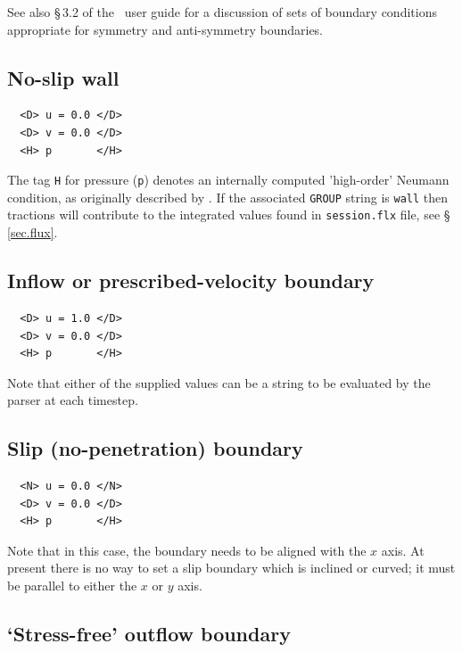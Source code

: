 \documentclass[11pt]{report}
\begin{document}
See also \S\,3.2 of the \Dog\ user guide for a discussion of sets of
boundary conditions appropriate for symmetry and anti-symmetry
boundaries.

\subsection{No-slip wall}

{\small
\begin{verbatim}
  <D> u = 0.0 </D>
  <D> v = 0.0 </D>
  <H> p       </H>
\end{verbatim}
}
\noindent The tag \verb+H+ for pressure (\verb+p+) denotes an
internally computed 'high-order' Neumann condition, as originally
described by \citet{kio91}.  If the associated \verb|GROUP| string is
\verb|wall| then tractions will contribute to the integrated values
found in \verb+session.flx+ file, see \S\,\ref{sec.flux}.

\subsection{Inflow or prescribed-velocity boundary}

{\small
\begin{verbatim}
  <D> u = 1.0 </D>
  <D> v = 0.0 </D>
  <H> p       </H>
\end{verbatim}
}
\noindent Note that either of the supplied values can be a string to
be evaluated by the parser at each timestep.

\subsection{Slip (no-penetration) boundary}

{\small
\begin{verbatim}
  <N> u = 0.0 </N>
  <D> v = 0.0 </D>
  <H> p       </H>
\end{verbatim}
}
\noindent Note that in this case, the boundary needs to be aligned
with the $x$ axis.  At present there is no way to set a slip boundary
which is inclined or curved; it must be parallel to either the $x$ or
$y$ axis.

\subsection{`Stress-free' outflow boundary}
\label{sec.stressfree}
\end{document}
